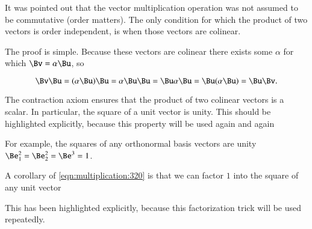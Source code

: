 %
%
It was pointed out that the vector multiplication operation was not assumed to be commutative (order matters).
The only condition for which the product of two vectors is order independent, is when those vectors are colinear.


The proof is simple.
Because these vectors are colinear there exists some \( \alpha \) for which \( \Bv = \alpha \Bu \), so

\begin{dmath}\label{eqn:multivector:380}
\Bv \Bu
=
(\alpha \Bu) \Bu
=
\alpha \Bu \Bu
=
\Bu \alpha \Bu
=
\Bu (\alpha \Bu)
=
\Bu \Bv.
\end{dmath}

The contraction axiom ensures that the product of two colinear vectors is a scalar.
In particular, the square of a unit vector is unity.
This should be highlighted explicitly, because this property will be used again and again

For example, the squares of any orthonormal basis vectors are unity \( \Be_1^2 = \Be_2^2 = \Be^3 = 1 \).

A corollary of
\cref{eqn:multiplication:320} is that we can factor \( 1 \) into
the square of any unit vector


This has been highlighted explicitly, because this factorization trick will be used repeatedly.
